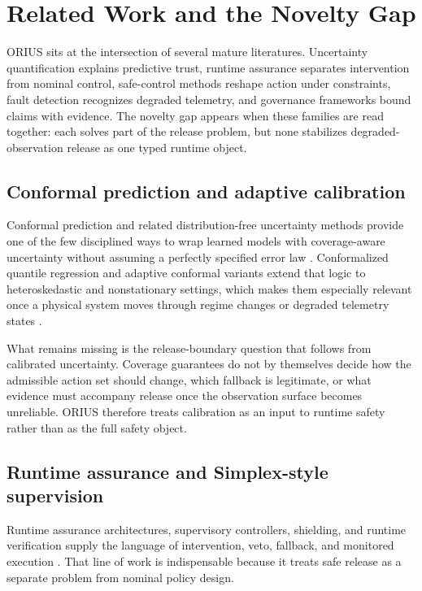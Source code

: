 \chapter{Related Work and the Novelty Gap}
\label{ch:related-work-novelty-gap}

ORIUS sits at the intersection of several mature literatures. Uncertainty quantification
explains predictive trust, runtime assurance separates intervention from nominal control,
safe-control methods reshape action under constraints, fault detection recognizes degraded
telemetry, and governance frameworks bound claims with evidence. The novelty gap appears
when these families are read together: each solves part of the release problem, but none
stabilizes degraded-observation release as one typed runtime object.

\section{Conformal prediction and adaptive calibration}
Conformal prediction and related distribution-free uncertainty methods provide one of the
few disciplined ways to wrap learned models with coverage-aware uncertainty without
assuming a perfectly specified error law
\cite{vovk2005algorithmic,lei2018distribution,romano2019conformalized,gibbs2021adaptive,angelopoulos2023gentle,barber2023beyond}.
Conformalized quantile regression and adaptive conformal variants extend that logic to
heteroskedastic and nonstationary settings, which makes them especially relevant once a
physical system moves through regime changes or degraded telemetry states
\cite{romano2019conformalized,gibbs2021adaptive,zaffran2022adaptive,stankeviciute2021conformal,xu2021dynamic,sesia2021comparison,bates2021distribution}.

What remains missing is the release-boundary question that follows from calibrated
uncertainty. Coverage guarantees do not by themselves decide how the admissible action set
should change, which fallback is legitimate, or what evidence must accompany release once
the observation surface becomes unreliable. ORIUS therefore treats calibration as an input
to runtime safety rather than as the full safety object.

\section{Runtime assurance and Simplex-style supervision}
Runtime assurance architectures, supervisory controllers, shielding, and runtime
verification supply the language of intervention, veto, fallback, and monitored execution
\cite{sha2001using,sha1998simplex,desai2019soter,bloem2015shield,bartocci2018introduction,havelund2004runtime,leucker2009brief,schierman2015run,bak2011runtime}.
That line of work is indispensable because it treats safe release as a separate problem from
nominal policy design.

